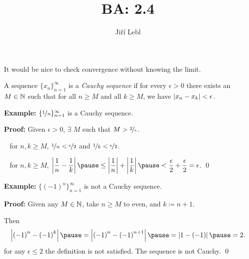 \documentclass[10pt,aspectratio=169]{beamer}
\author{Ji\v{r}\'i Lebl}
\institute[OSU]{%
Departemento pri Matematiko de Oklahoma {\^S}tata Universitato}
\title{BA: 2.4}
\date{}
\begin{document}
\begin{frame}
\titlepage
\end{frame}

\begin{frame}
It would be nice to check convergence without knowing the limit.

\pause

\begin{definition}
A sequence $\{ x_n \}_{n=1}^\infty$ is a \emph{Cauchy sequence}
if for every $\epsilon > 0$ there exists an $M \in {\mathbb{N}}$ such that
for all $n \geq M$ and all $k \geq M$, we have
\quad
$\left\lvert {x_n - x_k} \right\rvert < \epsilon$.
\end{definition}

\pause

\textbf{Example:}
$\{ \nicefrac{1}{n} \}_{n=1}^{\infty}$ is a Cauchy sequence.

\medskip
\pause

\textbf{Proof:}  Given $\epsilon > 0$, $\exists$ $M$ such that
$M > \nicefrac{2}{\epsilon}$.

\pause
\thus~ for $n,k \geq M$, \quad
$\nicefrac{1}{n} < \nicefrac{\epsilon}{2}$
and
$\nicefrac{1}{k} < \nicefrac{\epsilon}{2}$.

\pause
\medskip

\thus ~ for $n, k \geq M$, \quad
$\displaystyle \abs{\frac{1}{n} - \frac{1}{k}}
\pause
\leq
\abs{\frac{1}{n}} + \abs{\frac{1}{k}}
\pause
< \frac{\epsilon}{2} + \frac{\epsilon}{2} = \epsilon$. \qed

\pause
\medskip

\textbf{Example:}
$\bigl\{ {(-1)}^n \bigr\}_{n=1}^\infty$ is not a Cauchy sequence.

\medskip
\pause

\textbf{Proof:}
Given any $M \in {\mathbb{N}}$, take $n \geq M$ to even, and $k \coloneqq n+1$.

\pause
Then
\[
\abs{{(-1)}^n - {(-1)}^k}
\pause
=
\abs{{(-1)}^n - {(-1)}^{n+1}}
\pause
=
\abs{1 - (-1)}
\pause
= 2 .
\]
\pause
\thus
\quad for any $\epsilon \leq 2$ the definition is not satisfied.
%
%
\pause
\quad
\thus \quad The sequence is not Cauchy. \qed

%
%
%
%
%
%
\end{frame}
\end{document}
